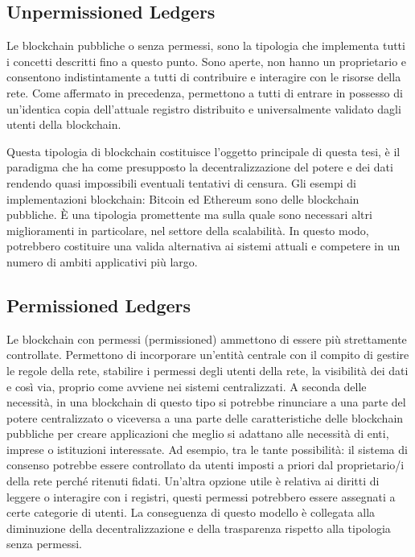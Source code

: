 \subsection{Unpermissioned Ledgers}

Le blockchain pubbliche o senza permessi, sono la tipologia che implementa tutti i concetti descritti fino a questo punto. Sono aperte, non hanno un proprietario e consentono indistintamente a tutti di contribuire e interagire con le risorse della rete. Come affermato in precedenza, permettono a tutti di entrare in possesso di un’identica copia dell’attuale registro distribuito e universalmente validato dagli utenti della blockchain.

Questa tipologia di blockchain costituisce l’oggetto principale di questa tesi, è il paradigma che ha come presupposto la decentralizzazione del potere e dei dati rendendo quasi impossibili eventuali tentativi di censura. Gli esempi di implementazioni blockchain: Bitcoin ed Ethereum sono delle blockchain pubbliche. È una tipologia promettente ma sulla quale sono necessari altri miglioramenti in particolare, nel settore della scalabilità. In questo modo, potrebbero costituire una valida alternativa ai sistemi attuali e competere in un numero di ambiti applicativi più largo.

\subsection{Permissioned Ledgers}

Le blockchain con permessi (permissioned) ammettono di essere più strettamente controllate. Permettono di incorporare un’entità centrale con il compito di gestire le regole della rete, stabilire i permessi degli utenti della rete, la visibilità dei dati e così via, proprio come avviene nei sistemi centralizzati. A seconda delle necessità, in una blockchain di questo tipo si potrebbe rinunciare a una parte del potere centralizzato o viceversa a una parte delle caratteristiche delle blockchain pubbliche per creare applicazioni che meglio si adattano alle necessità di enti, imprese o istituzioni interessate. Ad esempio, tra le tante possibilità: il sistema di consenso potrebbe essere controllato da utenti imposti a priori dal proprietario/i della rete perché ritenuti fidati. Un'altra opzione utile è relativa ai diritti di leggere o interagire con i registri, questi permessi potrebbero essere assegnati a certe categorie di utenti. La conseguenza di questo modello è collegata alla diminuzione della decentralizzazione e della trasparenza rispetto alla tipologia senza permessi.


